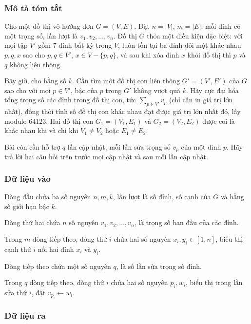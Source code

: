 \documentclass[11pt]{article}
\begin{document}
\subsubsection{Mô tả tóm tắt}

Cho một đồ thị vô hướng đơn \(G=(V,E)\). Đặt \(n=|V|\), \(m=|E|\); mỗi đỉnh có
một trọng số, lần lượt là \(v_1,v_2,\ldots,v_n\). Đồ thị \(G\) thỏa một điều
kiện đặc biệt: với mọi tập \(V'\) gồm \(7\) đỉnh bất kỳ trong \(V\), luôn tồn
tại ba đỉnh đôi một khác nhau \(p,q,x\) sao cho
\(p,q\in V'\), \(x\in V-\{p,q\}\), và sau khi xóa đỉnh \(x\) khỏi đồ thị thì
\(p\) và \(q\) không liên thông.

Bây giờ, cho hằng số \(k\). Cần tìm một đồ thị con liên thông
\(G'=(V',E')\) của \(G\) sao cho với mọi \(p\in V'\), bậc của \(p\) trong
\(G'\) không vượt quá \(k\). Hãy cực đại hóa tổng trọng số các đỉnh trong đồ
thị con, tức \(\sum_{p\in V'}v_p\) (chỉ cần in giá trị lớn nhất), đồng thời
tính số đồ thị con khác nhau đạt được giá trị lớn nhất đó, lấy modulo \(64123\).
Hai đồ thị con \(G_1=(V_1,E_1)\) và \(G_2=(V_2,E_2)\) được coi là khác nhau khi
và chỉ khi \(V_1\ne V_2\) hoặc \(E_1\ne E_2\).

Bài còn cần hỗ trợ \(q\) lần cập nhật; mỗi lần sửa trọng số \(v_p\) của một
đỉnh \(p\). Hãy trả lời hai câu hỏi trên trước mọi cập nhật và sau mỗi lần cập
nhật.

\subsubsection{Dữ liệu vào}

Dòng đầu chứa ba số nguyên \(n,m,k\), lần lượt là số đỉnh, số cạnh của \(G\) và
hằng số giới hạn bậc \(k\).

Dòng thứ hai chứa \(n\) số nguyên \(v_1,v_2,\ldots,v_n\), là trọng số ban đầu
của các đỉnh.

Trong \(m\) dòng tiếp theo, dòng thứ \(i\) chứa hai số nguyên
\(x_i,y_i\in[1,n]\), biểu thị cạnh thứ \(i\) nối hai đỉnh \(x_i\) và \(y_i\).

Dòng tiếp theo chứa một số nguyên \(q\), là số lần sửa trọng số đỉnh.

Trong \(q\) dòng tiếp theo, dòng thứ \(i\) chứa hai số nguyên \(p_i,w_i\), biểu
thị trong lần sửa thứ \(i\), đặt \(v_{p_i}\gets w_i\).

\subsubsection{Dữ liệu ra}
\end{document}
